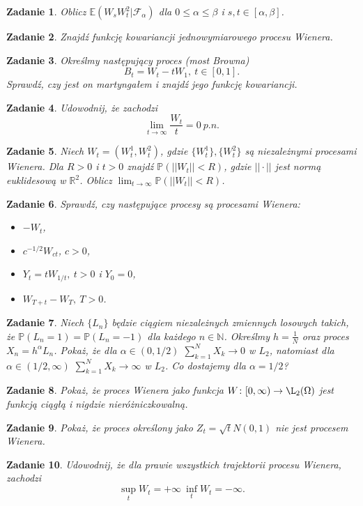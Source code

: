 \documentclass[12pt]{article}
\newtheorem{zd}{Zadanie}
\begin{document}
\begin{zd}
	Oblicz $\mathbb{E}\left(W_sW_t^2|\mathcal{F}_{\alpha}\right)$ dla $0\leq \alpha\leq \beta$ i $s,t \in [\alpha, \beta]$.
\end{zd}
\begin{zd}
	Znajdź funkcję kowariancji jednowymiarowego procesu Wienera.
\end{zd}
\begin{zd}
	Określmy następujący proces (most Browna)
	\begin{displaymath}
		B_t = W_t - tW_1, \ t\in[0,1].
	\end{displaymath}
	Sprawdź, czy jest on martyngałem i znajdź jego funkcję kowariancji.
\end{zd}
\begin{zd}
	Udowodnij, że zachodzi 
	\begin{displaymath}
	\lim_{t \to \infty}\frac{W_t}{t} = 0\ p.n.
	\end{displaymath}
\end{zd}
\begin{zd}
	Niech $W_t = (W_t^1, W_t^2)$, gdzie $\{W_t^1\}, \{W_t^2\}$ są niezależnymi procesami Wienera. Dla $R > 0$ i $t > 0$ znajdź $\mathbb{P}\left(||W_t|| < R	\right)$, gdzie $||\cdot||$ jest normą euklidesową w $\mathbb{R}^2$. Oblicz $\lim_{t \to \infty}\mathbb{P}\left(||W_t|| < R	\right)$.
\end{zd}
\begin{zd}
	Sprawdź, czy następujące procesy są procesami Wienera:
	\begin{itemize}
		\item $-W_t$,
		\item $c^{-1/2}W_{ct}$, $c>0$,
		\item $Y_t = tW_{1/t},\ t> 0$ i $Y_0 = 0$,
		\item $W_{T+t} - W_T, \ T > 0$.
	\end{itemize}
\end{zd}
\begin{zd}
	Niech $\{L_n\}$ będzie ciągiem niezależnych zmiennych losowych takich, że $\mathbb{P}\left(L_n = 1\right) = \mathbb{P}\left(L_n = -1\right)$ dla każdego $n\in\mathbb{N}$. Określmy $h = \frac{1}{N}$ oraz proces $X_n = h^{\alpha}L_n$. Pokaż, że dla $\alpha \in (0,1/2)$ $\sum_{k=1}^NX_k \to 0$ w $L_2$, natomiast dla $\alpha \in (1/2, \infty)$ $\sum_{k=1}^NX_k \to \infty$ w $L_2$. Co dostajemy dla $\alpha = 1/2$?
\end{zd}
\begin{zd}
	Pokaż, że proces Wienera jako funkcja $W\colon [0,\infty) \to \L_2(\Omega)$ jest funkcją ciągłą i nigdzie nieróżniczkowalną.
\end{zd}
\begin{zd}
	Pokaż, że proces określony jako $Z_t = \sqrt{t}N(0,1)$ nie jest procesem Wienera.
\end{zd}
\begin{zd}
	Udowodnij, że dla prawie wszystkich trajektorii procesu Wienera, zachodzi
	\begin{displaymath}
		\sup_tW_t = +\infty\ \inf_tW_t = -\infty.
	\end{displaymath}
\end{zd}
\end{document}

